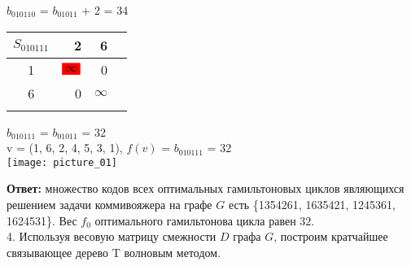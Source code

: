 \documentclass[12pt]{article}
\begin{document}
$b_{010110}$ = $b_{01011}$ + 2 = 34\\

\begin{flushleft}
 \begin{tabular}{c||rr||c}
$S_{010111}$  &2   & 6 & \\
\hline
\hline
1 & $\colorbox{red}{$\infty$}$      & 0 & \\
6 & 0   & $\infty$ & \\
\hline
\hline
  &   & \\
\end{tabular}
\end{flushleft}

$b_{010111}$ = $b_{01011}$  = 32\\



v = (1, 6, 2, 4, 5, 3, 1), $f(v)$ = $b_{010111}$  = 32\\

\texttt{[image: picture\_01]} 

	\noindent
	\textbf{Ответ:} множество кодов всех оптимальных гамильтоновых 
	циклов являющихся решением задачи коммивояжера на графе $G$ есть 
	\{1354261, 1635421, 1245361, 1624531\}.
	Вес $f_0$ оптимального гамильтонова цикла равен $32$. \\
	
	4. Используя весовую матрицу смежности $D$ графа $G$,
	построим кратчайшее связывающее дерево T волновым методом. \\
\end{document}

